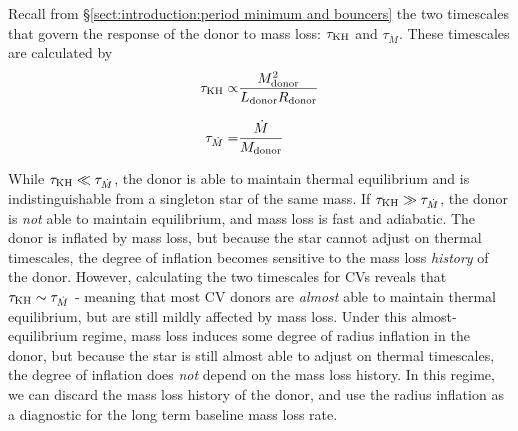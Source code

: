 Recall from \S\ref{sect:introduction:period minimum and bouncers} the two timescales that govern the response of the donor to mass loss: $\tau_{\rm KH}$ and $\tau_{\dot M}$. These timescales are calculated by
\begin{align}
    \tau_{\rm KH} \propto& \frac{M_{\rm donor}^2}{L_{\rm donor} R_{\rm donor}} \\[8pt]
    \tau_{\dot M} =& \frac{\dot M}{M_{\rm donor}}
\end{align}

While $\tau_{\rm KH} \ll \tau_{\dot M}$, the donor is able to maintain thermal equilibrium and is indistinguishable from a singleton star of the same mass.
If $\tau_{\rm KH} \gg \tau_{\dot M}$, the donor is \textit{not} able to maintain equilibrium, and mass loss is fast and adiabatic. The donor is inflated by mass loss, but because the star cannot adjust on thermal timescales, the degree of inflation becomes sensitive to the mass loss \textit{history} of the donor.
However, calculating the two timescales for CVs reveals that $\tau_{\rm KH} \sim \tau_{\dot M}$ \citep{knigge11} - meaning that most CV donors are \textit{almost} able to maintain thermal equilibrium, but are still mildly affected by mass loss.
Under this almost-equilibrium regime, mass loss induces some degree of radius inflation in the donor, but because the star is still almost able to adjust on thermal timescales, the degree of inflation does \textit{not} depend on the mass loss history. In this regime, we can discard the mass loss history of the donor, and use the radius inflation as a diagnostic for the long term baseline mass loss rate.

